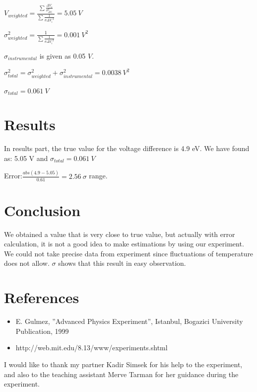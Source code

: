 \documentclass[aps,twocolumn,secnumarabic,nobalancelastpage,amsmath,amssymb,
nofootinbib]{revtex4}
\begin{document}
\begin{center}
${V}_{weighted}=\frac{\sum{\frac{\Delta{V_i}}{\sigma_{\Delta{V_i}}^2}}}{\sum{\frac{1}{\sigma{\Delta{V_{i}}}^2}}}=5.05\ V$
\end{center}

\begin{center}
${\sigma}_{weighted}^2=\frac{1}{\sum{\frac{1}{\sigma{\Delta{V_{i}}}^2}}}=0.001\ V^2$
\end{center}

$\sigma_{instrumental}$ is given as 0.05 $V$.

$\sigma_{total}^2=\sigma_{weighted}^2+\sigma_{instrumental}^2= 0.0038\ V^2 $

$\sigma_{total}=0.061\ V$

\section{Results}
In results part, the true value for the voltage difference is 4.9 eV. We have found as: 5.05 V and $\sigma_{total}=0.061\ V$

\begin{center}
Error:$\frac{abs(4.9-5.05)}{0.61}=2.56\ \sigma$ range.
\end{center}

\section{Conclusion}

We obtained a value that is very close to true value, but actually with error calculation, it is not a good idea to make estimations by using our experiment. We could not take precise data from experiment since fluctuations of temperature does not allow. $\sigma$ shows that this result in easy observation.


\section{References}
\begin{itemize}
\item E. Gulmez, ”Advanced Physics Experiment”, Istanbul, Bogazici University Publication, 1999
\item http://web.mit.edu/8.13/www/experiments.shtml
\end{itemize}






\begin{acknowledgments}

I would like to thank my partner Kadir Simsek for his help to the experiment, and also to the teaching assistant Merve Tarman for her guidance during the experiment.
\end{acknowledgments}

\end{document}
